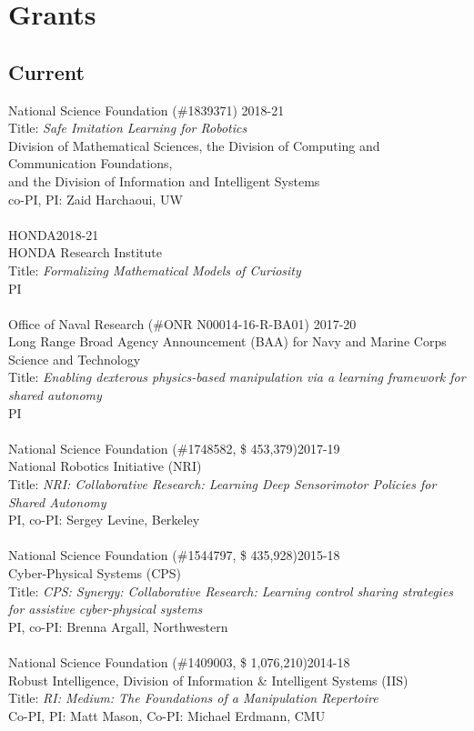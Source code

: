 
\section{Grants}

\subsection{Current}
\noindent
National Science Foundation (\#1839371) \hfill 2018-21\\
Title: \textit{Safe Imitation Learning for Robotics}\\
Division of Mathematical Sciences, the Division of Computing and Communication Foundations,\\and the Division of Information and Intelligent Systems\\
co-PI, PI: Zaid Harchaoui, UW\\
\\
HONDA\hfill 2018-21\\
HONDA Research Institute\\
Title: \textit{Formalizing Mathematical Models of Curiosity}\\
PI\\
\\
Office of Naval Research (\#ONR N00014-16-R-BA01) \hfill 2017-20\\
Long Range Broad Agency Announcement (BAA) for Navy and Marine Corps Science and Technology\\
Title: \textit{Enabling dexterous physics-based manipulation via a learning framework for shared autonomy}\\
PI\\
\\
National Science Foundation (\#1748582, \$ 453,379)\hfill 2017-19\\
National Robotics Initiative (NRI)\\
Title: \textit{NRI: Collaborative Research: Learning Deep Sensorimotor Policies for Shared Autonomy}\\
PI, co-PI: Sergey Levine, Berkeley\\
\\
National Science Foundation (\#1544797, \$ 435,928)\hfill 2015-18\\
Cyber-Physical Systems (CPS)\\
Title: \textit{CPS: Synergy: Collaborative Research: Learning control sharing strategies for assistive cyber-physical systems}\\
PI, co-PI: Brenna Argall, Northwestern\\
\\
National Science Foundation (\#1409003, \$ 1,076,210)\hfill 2014-18\\
Robust Intelligence, Division of Information \& Intelligent Systems (IIS)\\
Title: \textit{RI: Medium: The Foundations of a Manipulation Repertoire}\\
Co-PI, PI: Matt Mason, Co-PI: Michael Erdmann, CMU\\
\\

